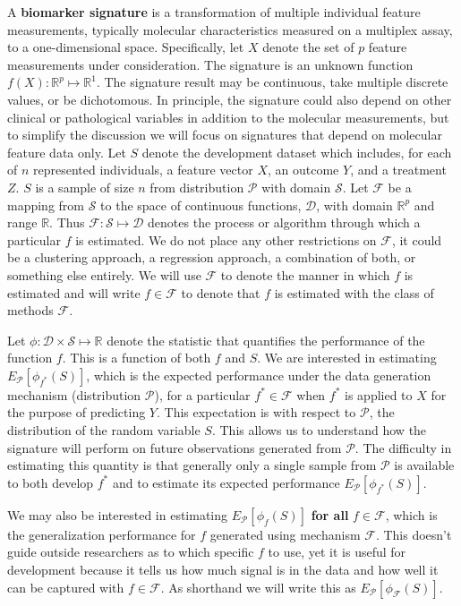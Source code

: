 \documentclass[11pt,]{article}
\begin{document}
A \textbf{biomarker signature} is a transformation of multiple
individual feature measurements, typically molecular characteristics
measured on a multiplex assay, to a one-dimensional space. Specifically,
let \(X\) denote the set of \(p\) feature measurements under
consideration. The signature is an unknown function
\(f(X): \mathbb{R}^p \mapsto \mathbb{R}^1\). The signature result may be
continuous, take multiple discrete values, or be dichotomous. In
principle, the signature could also depend on other clinical or
pathological variables in addition to the molecular measurements, but to
simplify the discussion we will focus on signatures that depend on
molecular feature data only. Let \(S\) denote the development dataset
which includes, for each of \(n\) represented individuals, a feature
vector \(X\), an outcome \(Y\), and a treatment \(Z\). \(S\) is a sample
of size \(n\) from distribution \(\mathcal{P}\) with domain
\(\mathcal{S}\). Let \(\mathcal{F}\) be a mapping from \(\mathcal{S}\)
to the space of continuous functions, \(\mathcal{D}\), with domain
\(\mathbb{R}^p\) and range \(\mathbb{R}\). Thus
\(\mathcal{F}: \mathcal{S} \mapsto \mathcal{D}\) denotes the process or
algorithm through which a particular \(f\) is estimated. We do not place
any other restrictions on \(\mathcal{F}\), it could be a clustering
approach, a regression approach, a combination of both, or something
else entirely. We will use \(\mathcal{F}\) to denote the manner in which
\(f\) is estimated and will write \(f \in \mathcal{F}\) to denote that
\(f\) is estimated with the class of methods \(\mathcal{F}\).

Let \(\phi: \mathcal{D} \times \mathcal{S} \mapsto \mathbb{R}\) denote
the statistic that quantifies the performance of the function \(f\).
This is a function of both \(f\) and \(S\). We are interested in
estimating \(E_\mathcal{P}[\phi_{f^*}(S)]\), which is the expected
performance under the data generation mechanism (distribution
\(\mathcal{P}\)), for a particular \(f^* \in \mathcal{F}\) when \(f^*\)
is applied to \(X\) for the purpose of predicting \(Y\). This
expectation is with respect to \(\mathcal{P}\), the distribution of the
random variable \(S\). This allows us to understand how the signature
will perform on future observations generated from \(\mathcal{P}\). The
difficulty in estimating this quantity is that generally only a single
sample from \(\mathcal{P}\) is available to both develop \(f^*\) and to
estimate its expected performance \(E_\mathcal{P}[\phi_{f^*}(S)]\).

We may also be interested in estimating \(E_\mathcal{P}[\phi_f(S)]\)
\textbf{for all} \(f \in \mathcal{F}\), which is the generalization
performance for \(f\) generated using mechanism \(\mathcal{F}\). This
doesn't guide outside researchers as to which specific \(f\) to use, yet
it is useful for development because it tells us how much signal is in
the data and how well it can be captured with \(f \in \mathcal{F}\). As
shorthand we will write this as \(E_\mathcal{P}[\phi_\mathcal{F}(S)]\).
\end{document}
